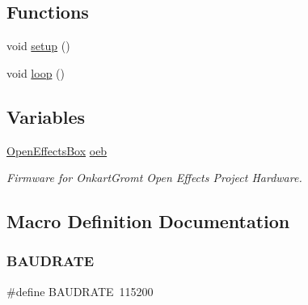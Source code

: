 \subsection*{Functions}
\begin{DoxyCompactItemize}
\item 
void \mbox{\hyperlink{general_open_effects_box__v4_8ino_a4fc01d736fe50cf5b977f755b675f11d}{setup}} ()
\item 
void \mbox{\hyperlink{general_open_effects_box__v4_8ino_afe461d27b9c48d5921c00d521181f12f}{loop}} ()
\end{DoxyCompactItemize}
\subsection*{Variables}
\begin{DoxyCompactItemize}
\item 
\mbox{\hyperlink{class_open_effects_box}{Open\+Effects\+Box}} \mbox{\hyperlink{general_open_effects_box__v4_8ino_adce890e5fa7a55c1ce4cd2e3da12afa8}{oeb}}
\begin{DoxyCompactList}\small\item\em Firmware for Onkart\+Gromt Open Effects Project Hardware. \end{DoxyCompactList}\end{DoxyCompactItemize}


\subsection{Macro Definition Documentation}
\mbox{\label{general_open_effects_box__v4_8ino_a734bbab06e1a9fd2e5522db0221ff6e3}} 
\subsubsection{\texorpdfstring{B\+A\+U\+D\+R\+A\+TE}{BAUDRATE}}
{\footnotesize\ttfamily \#define B\+A\+U\+D\+R\+A\+TE~115200}

\mbox{\label{general_open_effects_box__v4_8ino_a8c9afb758de9a0355c93fc926b8ce6b1}} 
